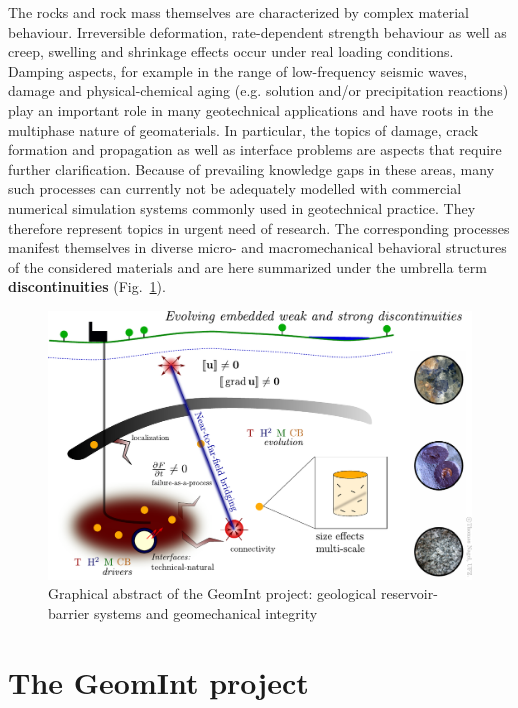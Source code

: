 The rocks and rock mass themselves are characterized by complex material behaviour. Irreversible deformation, rate-dependent strength behaviour as well as creep, swelling and shrinkage effects occur under real loading conditions. Damping aspects, for example in the range of low-frequency seismic waves, damage and physical-chemical aging (e.g. solution and/or precipitation reactions) play an important role in many geotechnical applications and have roots in the multiphase nature of geomaterials. In particular, the topics of damage, crack formation and propagation as well as interface problems are aspects that require further clarification. Because of prevailing knowledge gaps in these areas, many such processes can currently not be adequately modelled with commercial numerical simulation systems commonly used in geotechnical practice. They therefore represent topics in urgent need of research. The corresponding processes manifest themselves in diverse micro- and macromechanical behavioral structures of the considered materials and are here summarized under the umbrella term \textbf{discontinuities} (Fig.~\ref{fig:pro01}).

\begin{figure}[t!]
\centering
\includegraphics[width=1\textwidth]{figures/Barrier_concept.pdf}
\caption{Graphical abstract of the GeomInt project: geological reservoir-barrier systems and geomechanical integrity}
\label{fig:pro01}
\end{figure}

\section{The GeomInt project}

